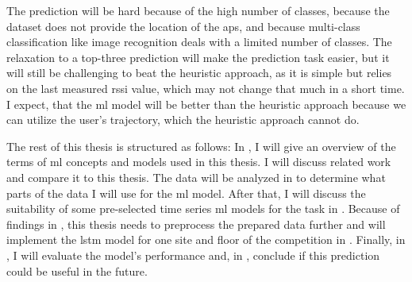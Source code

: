The prediction will be hard because of the high number of classes, because the dataset does not provide the location of the \acp{ap}, and because  multi-class classification like image recognition deals with a limited number of classes.
The relaxation to a top-three prediction will make the prediction task easier, but it will still be challenging to beat the heuristic approach, as it is simple but relies on the last measured \ac{rssi} value, which may not change that much in a short time. 
I expect,  that the \ac{ml} model will be better than the heuristic approach because we can utilize the user's trajectory, which the heuristic approach cannot do.

The rest of this thesis is structured as follows:
In , I will give an overview of the terms of \ac{ml} concepts and models used in this thesis.
 I will discuss related work and compare it to this thesis.
The data will be analyzed in  to determine what parts of the data I will use for the \ac{ml} model.
After that, I will discuss the suitability of some pre-selected time series \ac{ml} models for the task in . 
Because of findings in , this thesis needs to preprocess the prepared data further and will implement the \ac{lstm} model for one site and floor of the competition in .
Finally, in , I will evaluate the model's performance and, in , conclude if this prediction could be useful in the future.
